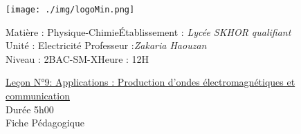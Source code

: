 \documentclass[12pt]{article}
\newcommand\headerMe[2]{\noindent{}#1\hfill#2}
\begin{document}
\begin{center}
\texttt{[image: ./img/logoMin.png]}
\vspace{-3cm}
\end{center}
\headerMe{Matière : Physique-Chimie}{Établissement : \emph{Lycée SKHOR qualifiant}}\\
\headerMe{ Unité : Electricité }{  Professeur :\emph{Zakaria Haouzan}}\\
\headerMe{Niveau : 2BAC-SM-X}{Heure : 12H}\\

\begin{center}
\underline{Leçon N°9: Applications : Production d’ondes électromagnétiques et
communication}\\
Durée 5h00
\\
    \vspace{.2cm}
\hrulefill
\Large{Fiche Pédagogique}
\hrulefill\\
\end{center}
\end{document}
